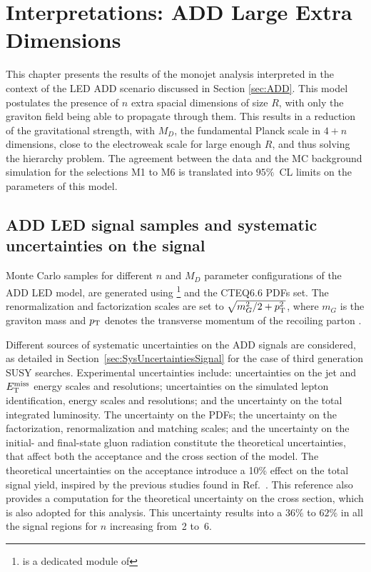 \clearpage





\cleardoublepage
\chapter{Interpretations: ADD Large Extra Dimensions}
    \label{chapter:ADDGravitonProduction}

This chapter presents the results of the monojet analysis interpreted in the context of the LED ADD scenario discussed in Section \ref{sec:ADD}.
This model postulates the presence of $n$ extra spacial dimensions of size $R$, with only the graviton field being able to propagate through them.
This results in a reduction of the gravitational strength, with $M_D$, the fundamental Planck scale in $4+n$ dimensions, close to the electroweak scale for large enough $R$, and thus solving the hierarchy problem.
The agreement between the data and the MC background simulation for the selections M1 to M6 is translated into $95\%$~CL limits on the parameters of this model.


\section{ADD LED signal samples and systematic uncertainties on the signal}

Monte Carlo samples for different $n$ and $M_D$ parameter configurations of the ADD LED model, are generated using \exograviton{}\footnote{\exograviton{} is a dedicated module of } and the CTEQ6.6 PDFs set.
The renormalization and factorization scales are set to $\sqrt{m_G^2 / 2 + p_{\mathrm{T}}^2}$, where $m_G$ is the graviton mass and $p_{\mathrm{T}}$ denotes the transverse momentum of the recoiling parton \cite{ATLAS:2012zim}.

Different sources of systematic uncertainties on the ADD signals are considered, as detailed in Section~\ref{sec:SysUncertaintiesSignal} for the case of third generation SUSY searches.
Experimental uncertainties include: uncertainties on the jet and $E_{\mathrm{T}}^{\mathrm{miss}}$ energy scales and resolutions; uncertainties on the simulated lepton identification, energy scales and resolutions; and the uncertainty on the total integrated luminosity.
The uncertainty on the PDFs; the uncertainty on the factorization, renormalization and matching scales; and the uncertainty on the initial- and final-state gluon radiation constitute the theoretical uncertainties, that affect both the acceptance and the cross section of the model.
The theoretical uncertainties on the acceptance introduce a 10\% effect on the total signal yield, inspired by the previous studies found in Ref.~\cite{ATLAS:2012zim}.
This reference also provides a computation for the theoretical uncertainty on the cross section, which is also adopted for this analysis.
This uncertainty results into a $36\%$ to $62\%$ in all the signal regions for $n$ increasing from~2 to~6.


